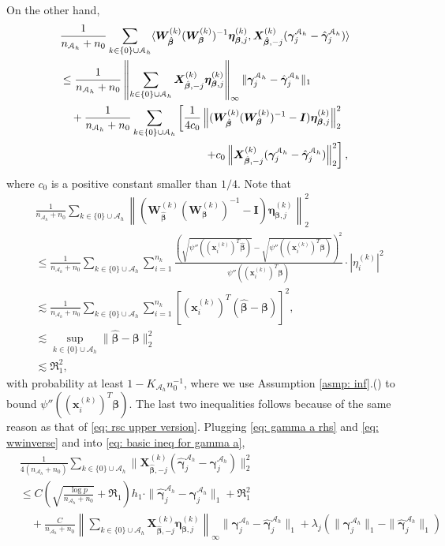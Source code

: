 \documentclass[12pt]{article}
\newcommand*{\rom}[1]{\romannumeral #1}
\newcommand{\infnorma}[1]{\left\|#1\right\|_{\infty}}
\newcommand{\twonorma}[1]{\left\|#1\right\|_{2}}
\newcommand{\twonorm}[1]{\|#1\|_{2}}
\newcommand{\onenorm}[1]{\|#1\|_{1}}
\newcommand{\norm}[1]{|#1|}
\newcommand{\bbeta}{\bm{\beta}}
\newcommand{\hbeta}{\hat{\bm{\beta}}}
\newcommand{\bgammaah}{\bm{\gamma}^{\mah}}
\newcommand{\hgammaah}{\hat{\bm{\gamma}}^{\mah}}
\newcommand{\bxk}[1]{\bm{x}^{(#1)}}
\newcommand{\bXk}[1]{\bm{X}^{(#1)}}
\newcommand{\bmetak}[1]{\bm{\eta}^{(#1)}}
\newcommand{\bWk}[1]{\bm{W}^{(#1)}}
\newcommand{\mah}{\mathcal{A}_h}
\newcommand{\nah}{n_{\mathcal{A}_h}}
\newcommand{\transet}{\{0\}\cup \mah}
\newcommand{\Kah}{K_{\mah}}
\newcommand{\<}{\langle}
\renewcommand{\>}{\rangle}
\begin{document}
On the other hand,
\begin{align}
	&\frac{1}{\nah+n_0}\sum_{k \in \transet}\<\bWk{k}_{\hbeta}(\bWk{k}_{\bbeta})^{-1}\bmetak{k}_{\bbeta, j}, \bXk{k}_{\hbeta, -j}(\bgammaah_j - \hgammaah_j)\> \\
	&\leq \frac{1}{\nah+n_0}\infnorma{\sum_{k \in \transet}\bXk{k}_{\hbeta, -j}\bmetak{k}_{\bbeta, j}}\onenorm{\bgammaah_j - \hgammaah_j} \\
	&\quad + \frac{1}{\nah+n_0}\sum_{k \in \transet}\left[\frac{1}{4c_0}\twonorma{(\bWk{k}_{\hbeta}(\bWk{k}_{\bbeta})^{-1} - \bm{I})\bmetak{k}_{\bbeta, j}}^2 \right. \\
	&\hspace{4.6cm} \left.+ c_0\twonorma{\bXk{k}_{\hbeta, -j}(\bgammaah_j - \hgammaah_j)}^2 \right], \label{eq: wwinverse}
\end{align}
where $c_0$ is a positive constant smaller than $1/4$. Note that
\begin{align}
	&\frac{1}{\nah+n_0}\sum_{k \in \transet}\twonorma{(\bWk{k}_{\hbeta}(\bWk{k}_{\bbeta})^{-1} - \bm{I})\bmetak{k}_{\bbeta, j}}^2 \\
	&\leq \frac{1}{\nah+n_0}\sum_{k \in \transet}\sum_{i=1}^{n_k}\frac{\left(\sqrt{\psi''((\bxk{k}_i)^T\hbeta)} - \sqrt{\psi''((\bxk{k}_i)^T\bbeta)}\right)^2}{\psi''((\bxk{k}_i)^T\bbeta)}\cdot \norm{\eta^{(k)}_i}^2 \\
	&\lesssim \frac{1}{\nah+n_0}\sum_{k \in \transet}\sum_{i=1}^{n_k} [(\bxk{k}_i)^T(\hbeta-\bbeta)]^2, \\
	&\lesssim \sup_{k \in \transet}\twonorm{\hbeta-\bbeta}^2 \\
	&\lesssim \Re_1^2,
\end{align}
with probability at least $1-\Kah n_0^{-1}$, where we use Assumption \ref{asmp: inf}.(\rom{1}) to bound $\psi''((\bxk{k}_i)^T\bbeta)$. The last two inequalities follows because of the same reason as that of \eqref{eq: rsc upper version}. Plugging \eqref{eq: gamma a rhs} and \eqref{eq: wwinverse} and into \eqref{eq: basic ineq for gamma a},
\begin{align}
	&\frac{1}{4(\nah+n_0)}\sum_{k \in \transet} \twonorm{\bXk{k}_{\hbeta, -j}(\hgammaah_j-\bgammaah_j)}^2 \\
	&\leq C\left(\sqrt{\frac{\log p}{\nah+n_0}} + \Re_1\right)h_1 \cdot \onenorm{\hgammaah_j - \bgammaah_j} + \Re_1^2 \\
	&\quad  + \frac{C}{\nah+n_0}\infnorma{\sum_{k \in \transet}\bXk{k}_{\hbeta, -j}\bmetak{k}_{\bbeta, j}}\onenorm{\bgammaah_j - \hgammaah_j} + \lambda_j(\onenorm{\bgammaah_j} - \onenorm{\hgammaah_j})
\end{align}
\end{document}
